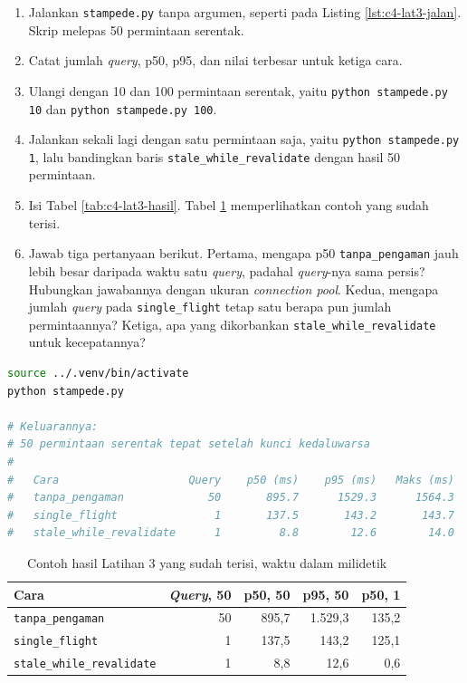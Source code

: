 \begin{enumerate}
  \item Jalankan \texttt{stampede.py} tanpa argumen, seperti pada Listing
        \ref{lst:c4-lat3-jalan}. Skrip melepas 50 permintaan serentak.
  \item Catat jumlah \textit{query}, p50, p95, dan nilai terbesar untuk ketiga cara.
  \item Ulangi dengan 10 dan 100 permintaan serentak, yaitu
        \texttt{python stampede.py 10} dan \texttt{python stampede.py 100}.
  \item Jalankan sekali lagi dengan satu permintaan saja, yaitu
        \texttt{python stampede.py 1}, lalu bandingkan baris
        \texttt{stale\_while\_revalidate} dengan hasil 50 permintaan.
  \item Isi Tabel \ref{tab:c4-lat3-hasil}. Tabel \ref{tab:c4-lat3-contoh}
        memperlihatkan contoh yang sudah terisi.
  \item Jawab tiga pertanyaan berikut. Pertama, mengapa p50
        \texttt{tanpa\_pengaman} jauh lebih besar daripada waktu satu \textit{query},
        padahal \textit{query}-nya sama persis? Hubungkan jawabannya dengan ukuran \textit{connection
        pool}. Kedua, mengapa jumlah \textit{query} pada \texttt{single\_flight}
        tetap satu berapa pun jumlah permintaannya? Ketiga, apa yang
        dikorbankan \texttt{stale\_while\_revalidate} untuk kecepatannya?
\end{enumerate}

\begin{lstlisting}[language=bash, caption={Memperagakan \textit{cache stampede}, tersedia di \berkas{sources/chapter04/stampede.py}}, label={lst:c4-lat3-jalan}]
source ../.venv/bin/activate
python stampede.py

# Keluarannya:
# 50 permintaan serentak tepat setelah kunci kedaluwarsa
#
#   Cara                    Query    p50 (ms)    p95 (ms)   Maks (ms)
#   tanpa_pengaman             50       895.7      1529.3      1564.3
#   single_flight               1       137.5       143.2       143.7
#   stale_while_revalidate      1         8.8        12.6        14.0
\end{lstlisting}

\begin{table}[!htb]
  \centering
  \caption{Contoh hasil Latihan 3 yang sudah terisi, waktu dalam milidetik}
  \label{tab:c4-lat3-contoh}
  \begin{tabularx}{\textwidth}{Xrrrr}
    \hline
    \textbf{Cara} & \textbf{\textit{Query}, 50} & \textbf{p50, 50} & \textbf{p95, 50} & \textbf{p50, 1} \\
    \hline
    \texttt{tanpa\_pengaman} & 50 & 895,7 & 1.529,3 & 135,2 \\
    \hline
    \texttt{single\_flight} & 1 & 137,5 & 143,2 & 125,1 \\
    \hline
    \texttt{stale\_while\_revalidate} & 1 & 8,8 & 12,6 & 0,6 \\
    \hline
  \end{tabularx}
\end{table}

